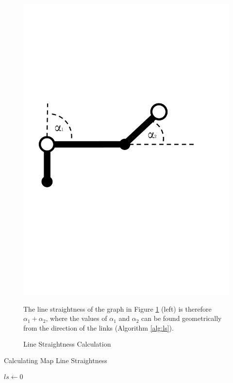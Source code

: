 \begin{figure}[h]
\centering
\hspace{-0.5cm}\begin{minipage}{.5\textwidth}
  \centering\includegraphics[width=.8\linewidth]{img/implementation/linestraightness.pdf}\caption{Line Straightness Calculation\label{fig:linestraightness}}
  \end{minipage}\hspace{0.5cm}\begin{minipage}{.5\textwidth}
The line straightness of the graph in Figure \ref{fig:linestraightness} (left) is therefore $\alpha_1 + \alpha_2$, where the values of $\alpha_1$ and $\alpha_2$ can be found geometrically from the direction of the links (Algorithm \ref{alg:ls}).
\end{minipage}
\end{figure}

\begin{algorithm}
\label{alg:ls}
 \caption{Calculating Map Line Straightness}
 $ls \gets 0$ \;
\end{algorithm}

